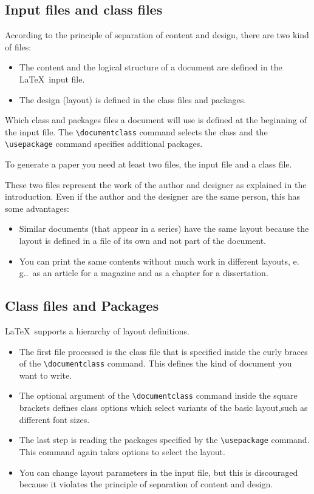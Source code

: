 \documentclass[twoside,a4paper]{refart}
\newcommand{\eg}{e.\,g..}
\begin{document}
\subsection{Input files and class files}

According to the principle of separation of content and design, 
there are two kind of files:

\begin{itemize}
\item
        The content and the logical structure of a document are defined in 
        the \LaTeX\ input file.
\item
        The design (layout) is defined in the class files and packages.
\end{itemize}
Which class and packages files a document will use is defined at the 
beginning of the input file.  The \verb|\documentclass| command 
selects the class and the \verb+\usepackage+ command specifies 
additional packages.

To generate a paper you need at least two files, the input file and a 
class file.

These two files represent the work of the author and designer as 
explained in the introduction. Even if the author and the designer are 
the same person, this has some advantages:

\begin{itemize}
\item
        Similar documents (that appear in a series) have the same layout 
        because the layout is defined in a file of its own and not part of 
        the document.
\item
        You can print the same contents without much work in different 
        layouts, \eg\ as an article for a magazine and as a chapter for a 
        dissertation.
\end{itemize}

\subsection{Class files and Packages}

\LaTeX\ supports a hierarchy of layout definitions.
\begin{itemize}
\item
        The first file processed is the class file that is specified inside 
        the curly braces of the \verb|\documentclass| command. This 
        defines the kind of document you want to write. 
\item
        The optional argument of the \verb|\documentclass| command inside 
        the square brackets defines class options which select variants of 
        the basic layout,such as different font sizes.
\item
        The last step is reading the packages specified by the 
        \verb|\usepackage| command. This command again takes options to 
        select the layout.
\item
        You can change layout parameters in the input file, but this is 
        discouraged because it violates the principle of separation of 
        content and design.

\end{itemize}
\end{document}
